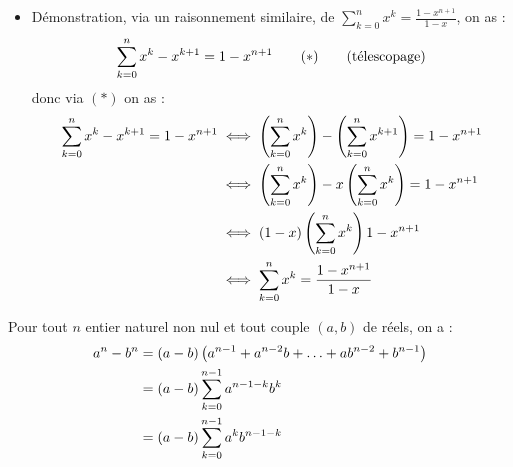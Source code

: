 \begin{dem}
\begin{itemize}
		\item Démonstration, via un raisonnement similaire, de \(\sum_{k=0}^n x^k = \frac{1-x^{n+1}}{1-x}\), on as :
		      \[
			      \sum_{k=0}^n x^k-x^{k+1} =1-x^{n+1} \qquad (*) \qquad \hfill \text{(télescopage)}
		      \]
		      donc via \((*)\) on as :
		      \begin{align*}
			      \sum_{k=0}^n x^k-x^{k+1} =1-x^{n+1} & \iff \left(\sum_{k=0}^n x^k\right) - \left(\sum_{k=0}^n x^{k+1}\right) = 1-x^{n+1} \\
			                                          & \iff \left(\sum_{k=0}^n x^k\right) - x\left(\sum_{k=0}^n x^k\right) = 1 -x^{n+1}   \\
			                                          & \iff \left(1-x\right)\left(\sum_{k=0}^n x^k\right) 1-x^{n+1}                       \\
			                                          & \iff  \sum_{k=0}^n x^k = \frac{1-x^{n+1}}{1-x}                           \\
		      \end{align*}

	\end{itemize}
\end{dem}

\begin{defprop}[Factorisation de \(a^n-b^n\) ]
	Pour tout \(n\) entier naturel non nul et tout couple \((a,b)\) de réels, on a :
	\begin{align*}
		a^n-b^n & = (a-b)\left(a^{n-1} + a^{n-2}b + \ldots + ab^{n-2} + b^{n-1}\right) \\
		        & = (a-b)\sum_{k=0}^{n-1} a^{n-1-k}b^k                            \\
		        & = (a-b)\sum_{k=0}^{n-1} a^kb^{n-1-k}                            \\
	\end{align*}
\end{defprop}

